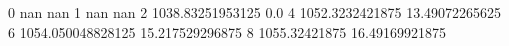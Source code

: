 0 nan nan
1 nan nan
2 1038.83251953125 0.0
4 1052.3232421875 13.49072265625
6 1054.050048828125 15.217529296875
8 1055.32421875 16.49169921875
